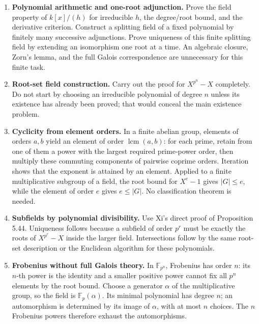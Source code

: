 \documentclass[
  11pt,
]{article}
\providecommand{\tightlist}{%
  \setlength{\itemsep}{0pt}\setlength{\parskip}{0pt}}
\begin{document}
\begin{enumerate}
\def\labelenumi{\arabic{enumi}.}
\tightlist
\item
  \textbf{Polynomial arithmetic and one-root adjunction.} Prove the
  field property of \(k[x]/(h)\) for irreducible \(h\), the degree/root
  bound, and the derivative criterion. Construct a splitting field of a
  fixed polynomial by finitely many successive adjunctions. Prove
  uniqueness of this finite splitting field by extending an isomorphism
  one root at a time. An algebraic closure, Zorn's lemma, and the full
  Galois correspondence are unnecessary for this finite task.
\item
  \textbf{Root-set field construction.} Carry out the proof for
  \(X^{p^n}-X\) completely. Do not start by choosing an irreducible
  polynomial of degree \(n\) unless its existence has already been
  proved; that would conceal the main existence problem.
\item
  \textbf{Cyclicity from element orders.} In a finite abelian group,
  elements of orders \(a,b\) yield an element of order
  \(\operatorname{lcm}(a,b)\): for each prime, retain from one of them a
  power with the largest required prime-power order, then multiply these
  commuting components of pairwise coprime orders. Iteration shows that
  the exponent is attained by an element. Applied to a finite
  multiplicative subgroup of a field, the root bound for \(X^e-1\) gives
  \(|G|\le e\), while the element of order \(e\) gives \(e\le |G|\). No
  classification theorem is needed.
\item
  \textbf{Subfields by polynomial divisibility.} Use Xi's direct proof
  of Proposition 5.44. Uniqueness follows because a subfield of order
  \(p^r\) must be exactly the roots of \(X^{p^r}-X\) inside the larger
  field. Intersections follow by the same root-set description or the
  Euclidean algorithm for these polynomials.
\item
  \textbf{Frobenius without full Galois theory.} In \(\mathbb F_{p^n}\),
  Frobenius has order \(n\): its \(n\)-th power is the identity and a
  smaller positive power cannot fix all \(p^n\) elements by the root
  bound. Choose a generator \(\alpha\) of the multiplicative group, so
  the field is \(\mathbb F_p(\alpha)\). Its minimal polynomial has
  degree \(n\); an automorphism is determined by its image of
  \(\alpha\), with at most \(n\) choices. The \(n\) Frobenius powers
  therefore exhaust the automorphisms.
\end{enumerate}
\end{document}
